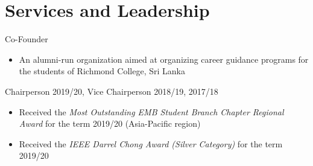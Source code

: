 \documentclass[10pt,a4paper,sans]{moderncv} %
\begin{document}




\section{Services and Leadership}
{Co-Founder}{}{}{
  \begin{itemize}
    \item An alumni-run organization aimed at organizing career guidance programs for the students of Richmond College, Sri Lanka
  \end{itemize}
}

{Chairperson 2019/20, Vice Chairperson 2018/19, 2017/18}{}{}{
  \begin{itemize}
    \item Received the \textit{Most Outstanding EMB Student Branch Chapter Regional Award} for the term 2019/20 (Asia-Pacific region)
    \item Received the \textit{IEEE Darrel Chong Award (Silver Category)} for the term 2019/20
  \end{itemize}
}
\end{document}
